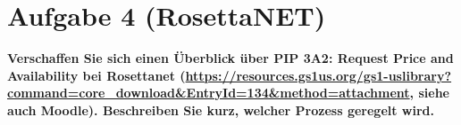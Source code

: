 \section{Aufgabe 4 (RosettaNET)}
\textbf{Verschaffen Sie sich einen Überblick über PIP 3A2: Request Price and Availability bei
Rosettanet (\url{https://resources.gs1us.org/gs1-uslibrary?
command=core\_download\&EntryId=134\&method=attachment}, siehe auch Moodle).
Beschreiben Sie kurz, welcher Prozess geregelt wird.}



\clearpage 